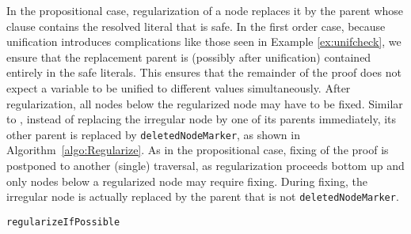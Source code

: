 In the propositional case, regularization of a node replaces it by the parent whose clause contains the resolved literal that is safe. In the first order case, because unification introduces complications like those seen in Example \ref{ex:unifcheck}, we ensure that the replacement parent is (possibly after unification) contained entirely in the safe literals. This ensures that the remainder of the proof does not expect a variable to be unified to different values simultaneously. After regularization, all nodes below the regularized node may have to be fixed. 
Similar to {\RPI}, instead of replacing the irregular node by one of its parents immediately, 
its other parent is replaced by \texttt{deletedNodeMarker}, as shown in Algorithm~\ref{algo:Regularize}.
As in the propositional case, fixing of the proof is postponed to another (single) traversal, as regularization proceeds bottom up and only nodes below a regularized node may require fixing.
During fixing, the irregular node is actually replaced by the parent that is not \texttt{deletedNodeMarker}.


\begin{algorithm}
\begin{footnotesize}



\BlankLine
\caption{\label{algo:Regularize} \texttt{regularizeIfPossible}}
\end{footnotesize}
\end{algorithm}


